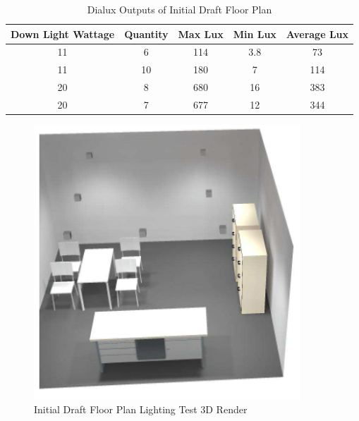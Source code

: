 \begin{table}[!ht]
	\centering
	\renewcommand{\arraystretch}{1}
	\begin{tabular}{|c|c|c|c|c|}
		\hline
		\multicolumn{1}{|l|}{\textbf{Down Light Wattage}} & \multicolumn{1}{l|}{\textbf{Quantity}} & \multicolumn{1}{l|}{\textbf{Max Lux}} & \multicolumn{1}{l|}{\textbf{Min Lux}} & \multicolumn{1}{l|}{\textbf{Average Lux}} \\ \hline
		11 & 6 & 114 & 3.8 & 73 \\ \hline
		11 & 10 & 180 & 7 & 114 \\ \hline
		20 & 8 & 680 & 16 & 383 \\ \hline
		20 & 7 & 677 & 12 & 344 \\ \hline
	\end{tabular}
	\caption{Dialux Outputs of Initial Draft Floor Plan}
	\label{table:draftFloorPlanDialuxOutputs}
\end{table} 

\begin{figure}[H]
	\hfill\includegraphics[width = 100mm]{images/lighting_draft_3D}\hspace*{\fill}
	\caption{Initial Draft Floor Plan Lighting Test 3D Render} 
	\label{fig:DraftLighting3D}
\end{figure} 

